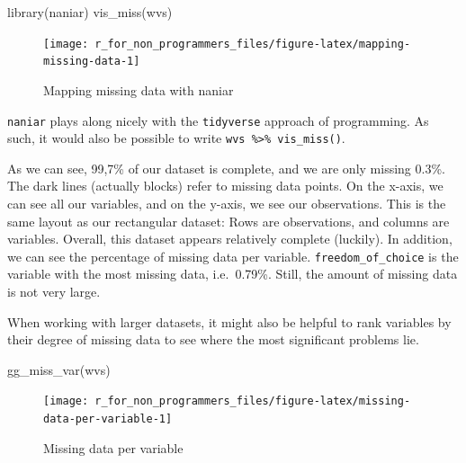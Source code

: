 \documentclass[
]{book}
\newenvironment{Shaded}{\begin{snugshade}}{\end{snugshade}}
\newcommand{\FunctionTok}[1]{\textcolor[rgb]{0.00,0.00,0.00}{#1}}
\newcommand{\NormalTok}[1]{#1}
\begin{document}
\begin{Shaded}
\begin{Highlighting}[]
\FunctionTok{library}\NormalTok{(naniar)}
\FunctionTok{vis\_miss}\NormalTok{(wvs)}
\end{Highlighting}
\end{Shaded}

\begin{figure}

{\centering \texttt{[image: r\_for\_non\_programmers\_files/figure-latex/mapping-missing-data-1]} 

}

\caption{Mapping missing data with naniar}\label{fig:mapping-missing-data}
\end{figure}

\texttt{naniar} plays along nicely with the \texttt{tidyverse} approach of programming. As such, it would also be possible to write \texttt{wvs\ \%\textgreater{}\%\ vis\_miss()}.

As we can see, 99,7\% of our dataset is complete, and we are only missing 0.3\%. The dark lines (actually blocks) refer to missing data points. On the x-axis, we can see all our variables, and on the y-axis, we see our observations. This is the same layout as our rectangular dataset: Rows are observations, and columns are variables. Overall, this dataset appears relatively complete (luckily). In addition, we can see the percentage of missing data per variable. \texttt{freedom\_of\_choice} is the variable with the most missing data, i.e.~0.79\%. Still, the amount of missing data is not very large.

When working with larger datasets, it might also be helpful to rank variables by their degree of missing data to see where the most significant problems lie.

\begin{Shaded}
\begin{Highlighting}[]
\FunctionTok{gg\_miss\_var}\NormalTok{(wvs)}
\end{Highlighting}
\end{Shaded}

\begin{figure}

{\centering \texttt{[image: r\_for\_non\_programmers\_files/figure-latex/missing-data-per-variable-1]} 

}

\caption{Missing data per variable}\label{fig:missing-data-per-variable}
\end{figure}
\end{document}

